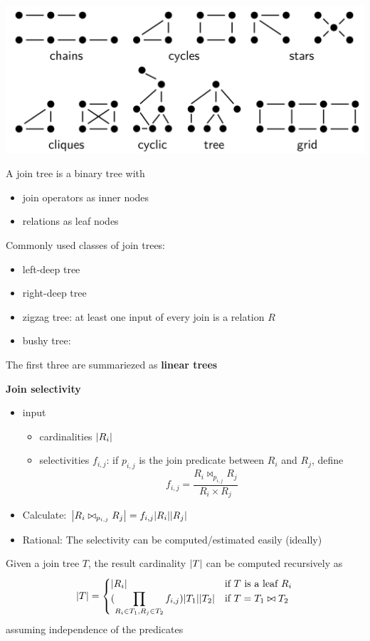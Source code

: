 \documentclass[11pt]{article}
\begin{document}
\begin{center}
\includegraphics[width=.8\textwidth]{../images/db/3.png}
\end{center}



A join tree is a binary tree with
\begin{itemize}
\item join operators as inner nodes
\item relations as leaf nodes
\end{itemize}

Commonly used classes of join trees:
\begin{itemize}
\item left-deep tree
\item right-deep tree
\item zigzag tree: at least one input of every join is a relation \(R\)
\item bushy tree:
\end{itemize}
The first three are summariezed as \textbf{linear trees}

\textbf{Join selectivity}
\begin{itemize}
\item input
\begin{itemize}
\item cardinalities \(\abs{R_i}\)
\item selectivities \(f_{i,j}\): if \(p_{i,j}\) is the join predicate between \(R_i\) and \(R_j\), define
\begin{equation*}
f_{i,j}=\frac{R_i\bowtie_{p_{i,j}}R_j}{R_i\times R_j}
\end{equation*}
\end{itemize}
\item Calculate: \(\abs{R_i\bowtie_{p_{i,j}}R_j}=f_{i,j}\abs{R_i}\abs{R_j}\)
\item Rational: The selectivity can be computed/estimated easily (ideally)
\end{itemize}

Given a join tree \(T\), the result cardinality \(\abs{T}\) can be computed recursively as
\begin{equation*}
\abs{T}=
\begin{cases}
\abs{R_i}&\text{if $T$ is a leaf }R_i\\
(\displaystyle\prod_{R_i\in T_1,R_j\in T_2}f_{i,j})\abs{T_1}\abs{T_2}&\text{if }T=T_1\bowtie T_2
\end{cases}
\end{equation*}
assuming independence of the predicates
\end{document}
